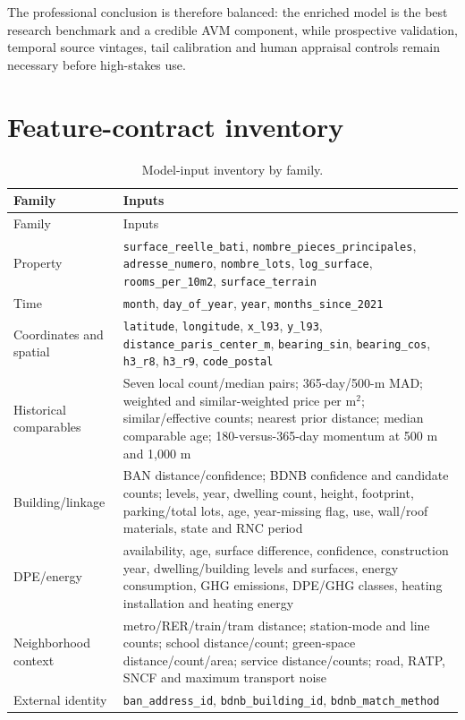 \documentclass[11pt,a4paper]{article}
\begin{document}
The professional conclusion is therefore balanced: the enriched model is the
best research benchmark and a credible AVM component, while prospective
validation, temporal source vintages, tail calibration and human appraisal
controls remain necessary before high-stakes use.

\appendix
\section{Feature-contract inventory}

\begin{longtable}{p{3.4cm}p{12.2cm}}
\caption{Model-input inventory by family.}\label{tab:features}\\
\toprule
Family & Inputs \\
\midrule
\endfirsthead
\toprule
Family & Inputs \\
\midrule
\endhead
Property & \texttt{surface\_reelle\_bati}, \texttt{nombre\_pieces\_principales},
\texttt{adresse\_numero}, \texttt{nombre\_lots}, \texttt{log\_surface},
\texttt{rooms\_per\_10m2}, \texttt{surface\_terrain} \\
Time & \texttt{month}, \texttt{day\_of\_year}, \texttt{year},
\texttt{months\_since\_2021} \\
Coordinates and spatial & \texttt{latitude}, \texttt{longitude},
\texttt{x\_l93}, \texttt{y\_l93}, \texttt{distance\_paris\_center\_m},
\texttt{bearing\_sin}, \texttt{bearing\_cos}, \texttt{h3\_r8},
\texttt{h3\_r9}, \texttt{code\_postal} \\
Historical comparables & Seven local count/median pairs; 365-day/500-m MAD;
weighted and similar-weighted price per m$^2$; similar/effective counts;
nearest prior distance; median comparable age; 180-versus-365-day momentum at
500 m and 1,000 m \\
Building/linkage & BAN distance/confidence; BDNB confidence and candidate counts;
levels, year, dwelling count, height, footprint, parking/total lots, age,
year-missing flag, use, wall/roof materials, state and RNC period \\
DPE/energy & availability, age, surface difference, confidence, construction
year, dwelling/building levels and surfaces, energy consumption, GHG emissions,
DPE/GHG classes, heating installation and heating energy \\
Neighborhood context & metro/RER/train/tram distance; station-mode and line
counts; school distance/count; green-space distance/count/area; service
distance/counts; road, RATP, SNCF and maximum transport noise \\
External identity & \texttt{ban\_address\_id}, \texttt{bdnb\_building\_id},
\texttt{bdnb\_match\_method} \\
\bottomrule
\end{longtable}
\end{document}
